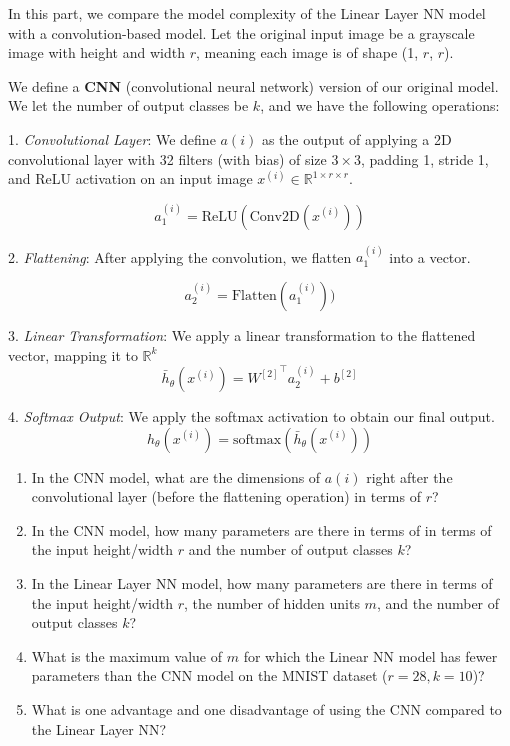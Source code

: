 \item {} In this part, we compare the model complexity of the Linear Layer NN model with a convolution-based model. Let the original input image be a grayscale image with height and width $r$, meaning each image is of shape (1, $r$, $r$).

We define a \textbf{CNN} (convolutional neural network) version of our original model. We let the number of output classes be $k$, and we have the following operations:

1. \textit{Convolutional Layer}: We define \( a(i) \) as the output of applying a 2D convolutional layer with 32 filters (with bias) of size \( 3 \times 3 \), padding 1, stride 1, and ReLU activation on an input image \( x^{(i)} \in \mathbb{R}^{1 \times r \times r}\). %

\[a_1^{(i)} = \mathrm{ReLU}(\mathrm{Conv2D}(x^{(i)}))\]

2. \textit{Flattening}: After applying the convolution, we flatten \( a_1^{(i)} \) into a vector.

\[a_2^{(i)} = \mathrm{Flatten}(a_1^{(i)}))\]

3. \textit{Linear Transformation}: We apply a linear transformation to the flattened vector, mapping it to $\mathbb{R}^k$
\[
\bar{h}_{\theta}(x^{(i)}) = {W^{[2]}}^\top a_2^{(i)} + b^{[2]}
\]

4. \textit{Softmax Output}: We apply the softmax activation to obtain our final output.
\[
{h}_{\theta}(x^{(i)}) = \mathrm{softmax}(\bar{h}_{\theta}(x^{(i)})) 
\]

\begin{enumerate}
    \item {} In the CNN model, what are the dimensions of $a(i)$ right after the convolutional layer (before the flattening operation) in terms of $r$?

    \item {} In the CNN model, how many parameters are there in terms of in terms of the input height/width $r$ and the number of output classes $k$? %

    \item {} In the Linear Layer NN model, how many parameters are there in terms of the input height/width $r$, the number of hidden units $m$, and the number of output classes $k$? %

    \item {} What is the maximum value of $m$ for which the Linear NN model has fewer parameters than the CNN model on the MNIST dataset ($r=28, k=10$)?
    
    \item {} What is one advantage and one disadvantage of using the CNN compared to the Linear Layer NN?
    
\end{enumerate}